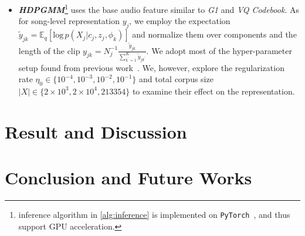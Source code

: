 \documentclass{article}
\begin{document}
\begin{itemize}[noitemsep, leftmargin=*]
    \item \emph{\textbf{HDPGMM}}\footnote{inference algorithm in \cref{alg:inference} is implemented on \texttt{PyTorch}~\cite{NEURIPS2019_9015}, and thus support GPU acceleration.} uses the base audio feature similar to \emph{G1} and \emph{VQ Codebook}. As for song-level representation $y_{j}$, we employ the expectation $\tilde{y}_{jk} = \mathbb{E}_{q}[\text{log}\,p(X_{j}|c_{j}, z_{j}, \phi_{k})]$ and normalize them over components and the length of the clip $y_{jk} = N_{j}^{-1}\frac{\tilde{y}_{jk}}{\sum_{k^{\prime}=1}^{K}\tilde{y}_{jk^{\prime}}}$. We adopt most of the hyper-parameter setup found from previous work~\cite{DBLP:journals/jmlr/WangPB11}. We, however, explore the regularization rate $\eta_{0} \in \{10^{-4}, 10^{-3}, 10^{-2}, 10^{-1}\}$ and total corpus size $|X| \in \{2\times10^{3}, 2\times10^{4}, 213354\}$ to examine their effect on the representation.
\end{itemize}


\section{Result and Discussion}\label{sec:result_discussion}


\section{Conclusion and Future Works}\label{sec:conclusion}




\end{document}

